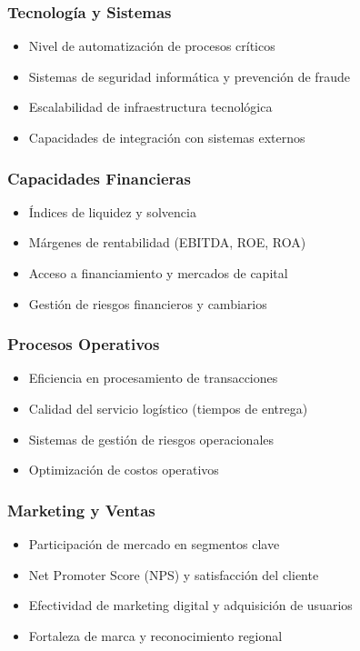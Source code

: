 \subsubsection{Tecnología y Sistemas}
\begin{itemize}
\item Nivel de automatización de procesos críticos
\item Sistemas de seguridad informática y prevención de fraude
\item Escalabilidad de infraestructura tecnológica
\item Capacidades de integración con sistemas externos
\end{itemize}

\subsubsection{Capacidades Financieras}
\begin{itemize}
\item Índices de liquidez y solvencia
\item Márgenes de rentabilidad (EBITDA, ROE, ROA)
\item Acceso a financiamiento y mercados de capital
\item Gestión de riesgos financieros y cambiarios
\end{itemize}

\subsubsection{Procesos Operativos}
\begin{itemize}
\item Eficiencia en procesamiento de transacciones
\item Calidad del servicio logístico (tiempos de entrega)
\item Sistemas de gestión de riesgos operacionales
\item Optimización de costos operativos
\end{itemize}

\subsubsection{Marketing y Ventas}
\begin{itemize}
\item Participación de mercado en segmentos clave
\item Net Promoter Score (NPS) y satisfacción del cliente
\item Efectividad de marketing digital y adquisición de usuarios
\item Fortaleza de marca y reconocimiento regional
\end{itemize}

